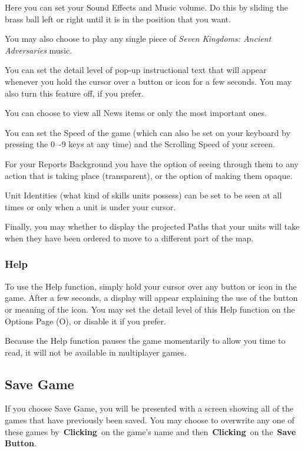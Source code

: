 Here you can set your Sound Effects and Music volume. Do this by sliding the brass ball left or right until it is in the position that you want.

You may also choose to play any single piece of \textit{Seven Kingdoms: Ancient Adversaries} music.

You can set the detail level of pop-up instructional text that will appear whenever you hold the cursor over a button or icon for a few seconds. You may also turn this feature off, if you prefer.

You can choose to view all News items or only the most important ones.

You can set the Speed of the game (which can also be set on your keyboard by pressing the 0–-9 keys at any time) and the Scrolling Speed of your screen.

For your Reports Background you have the option of seeing through them to any action that is taking place (transparent), or the option of making them opaque.

Unit Identities (what kind of skills units possess) can be set to be seen at all times or only when a unit is under your cursor.

Finally, you may whether to display the projected Paths that your units will take when they have been ordered to move to a different part of the map.

\subsubsection{Help}

To use the Help function, simply hold your cursor over any button or icon in the game. After a few seconds, a display will appear explaining the use of the button or meaning of the icon. You may set the detail level of this Help function on the Options Page (O), or disable it if you prefer.

Because the Help function pauses the game momentarily to allow you time to read, it will not be available in multiplayer games.

\subsection{Save Game}

If you choose Save Game, you will be presented with a screen showing all of the games that have previously been saved. You may choose to overwrite any one of these games by \textbf{Clicking} on the game’s name and then \textbf{Clicking} on the \textbf{Save Button}.

